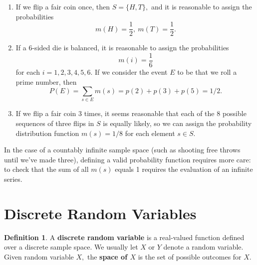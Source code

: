 \documentclass[
]{book}
\theoremstyle{definition}
\newtheorem{definition}{Definition}[chapter]
\theoremstyle{definition}
\theoremstyle{definition}
\theoremstyle{definition}
\theoremstyle{remark}
\begin{document}
\begin{enumerate}
\def\labelenumi{\arabic{enumi}.}
\item
  If we flip a fair coin once, then \(S = \{H,T\},\) and it is reasonable to assign the probabilities \[m(H) = \frac{1}{2}, ~ m(T) = \frac{1}{2}.\]
\item
  If a 6-sided die is balanced, it is reasonable to assign the probabilities \[m(i) = \frac{1}{6}\] for each \(i = 1, 2, 3, 4, 5, 6\). If we consider the event \(E\) to be that we roll a prime number, then \[P(E) = \sum_{s \in E} m(s) = p(2) + p(3) + p(5) = 1/2.\]
\item
  If we flip a fair coin 3 times, it seems reasonable that each of the 8 possible sequences of three flips in \(S\) is equally likely, so we can assign the probability distribution function \(m(s) = 1/8\) for each element \(s \in S\).
\end{enumerate}

In the case of a countably infinite sample space (such as shooting free throws until we've made three), defining a valid probability function requires more care: to check that the sum of all \(m(s)\) equals 1 requires the evaluation of an infinite series.

\section{Discrete Random Variables}\label{discrete-rv-initial}

\begin{definition}
\protect\hypertarget{def:random-variable}{}\label{def:random-variable}A \textbf{discrete random variable} is a real-valued function defined over a discrete sample space. We usually let \(X\) or \(Y\) denote a random variable. Given random variable \(X,\) the \textbf{space of \(X\)} is the set of possible outcomes for \(X\).
\end{definition}
\end{document}
